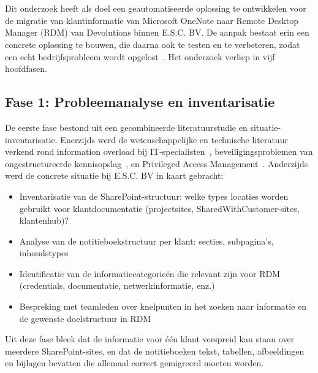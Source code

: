 ﻿%

\chapter{}%
\label{ch:methodologie}

Dit onderzoek heeft als doel een geautomatiseerde oplossing te ontwikkelen voor de migratie van klantinformatie van Microsoft OneNote naar Remote Desktop Manager (RDM) van Devolutions binnen E.S.C. BV. De aanpak bestaat erin een concrete oplossing te bouwen, die daarna ook te testen en te verbeteren, zodat een echt bedrijfsprobleem wordt opgelost~\autocite{Walker2007}. Het onderzoek verliep in vijf hoofdfasen.

\section{Fase 1: Probleemanalyse en inventarisatie}
\label{sec:fase1-probleemanalyse}

De eerste fase bestond uit een gecombineerde literatuurstudie en situatie-inventarisatie. Enerzijds werd de wetenschappelijke en technische literatuur verkend rond information overload bij IT-specialisten~\autocite{tomsu2024infooverload}, beveiligingsproblemen van ongestructureerde kennisopslag~\autocite{hay2025onenote}, en Privileged Access Management~\autocite{garbis2021pam}. Anderzijds werd de concrete situatie bij E.S.C. BV in kaart gebracht:

\begin{itemize}
    \item Inventarisatie van de SharePoint-structuur: welke types locaties worden gebruikt voor klantdocumentatie (projectsites, SharedWithCustomer-sites, klantenhub)?
    \item Analyse van de notitieboekstructuur per klant: secties, subpagina's, inhoudstypes
    \item Identificatie van de informatiecategorieën die relevant zijn voor RDM (credentials, documentatie, netwerkinformatie, enz.)
    \item Bespreking met teamleden over knelpunten in het zoeken naar informatie en de gewenste doelstructuur in RDM
\end{itemize}

Uit deze fase bleek dat de informatie voor één klant verspreid kan staan over meerdere SharePoint-sites, en dat de notitieboeken tekst, tabellen, afbeeldingen en bijlagen bevatten die allemaal correct gemigreerd moeten worden.

